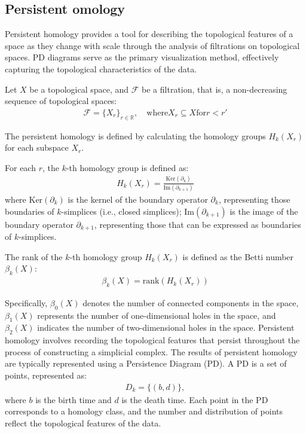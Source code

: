 \documentclass[5GeSdc,ASOC,numref,printGA,printHL,CASflow,nocrossmark,longtitle,PROOF]{/usr/local/texlive/iTemplates/01-Templates/01-Els-Jnl/01-Standard_Templates/V1/ELS_MDL5-V1-6}
\begin{document}
\begin{articlestyle}
\begin{definition}
	
\end{definition}

\subsection{Persistent omology}\label{subsec2.2}

Persistent homology provides a tool for describing the topological features of a space as they change with scale through the analysis of filtrations on topological spaces. PD diagrams serve as the primary visualization method, effectively capturing the topological characteristics of the data.

\begin{definition}[filtration]\label{definition3} Let $ X $ be a topological space, and $ \mathcal{F} $ be a filtration, that is, a non-decreasing sequence of topological spaces:  
	\begin{align*}  
	\mathcal{F} = {\{X_r \}}_{r \in \mathbb{R}}, \quad \text{where} X_r \subseteq X \text{for} r < r'  
	\end{align*}  
	
	
\end{definition}
The persistent homology is defined by calculating the homology groups $ H_k(X_r) $ for each subspace $ X_r $.  
\begin{definition}\label{definition4} For each $ r $, the $ k $-th homology group is defined as:  
	\begin{align*}  
	H_k(X_r) = \frac{\text{Ker}(\partial_k)}{\text{Im}(\partial_{k+1})} \tag{4}  
	\end{align*}  
where $ \text{Ker}(\partial_k) $ is the kernel of the boundary operator $ \partial_k $, representing those boundaries of $ k $-simplices (i.e., closed simplices); $ \text{Im}(\partial_{k+1}) $ is the image of the boundary operator $ \partial_{k+1} $, representing those that can be expressed as boundaries of $ k $-simplices.  
	
	The rank of the $ k $-th homology group $ H_k(X_r) $ is defined as the Betti number $ \beta_k(X) $:  
	\begin{align*}  
	\beta_k(X) = \text{rank}(H_k(X_r)) \tag{5}  
	\end{align*}  
\end{definition}
Specifically, $ \beta_0(X) $ denotes the number of connected components in the space, $ \beta_1(X) $ represents the number of one-dimensional holes in the space, and $ \beta_2(X) $ indicates the number of two-dimensional holes in the space. Persistent homology involves recording the topological features that persist throughout the process of constructing a simplicial complex. The results of persistent homology are typically represented using a Persistence Diagram (PD). A PD is a set of points, represented as:  
\begin{align*}  
D_k = \{(b, d)\},   
\end{align*}  
where $ b $ is the birth time and $ d $ is the death time. Each point in the PD corresponds to a homology class, and the number and distribution of points reflect the topological features of the data.  


\end{articlestyle}
\end{document}
